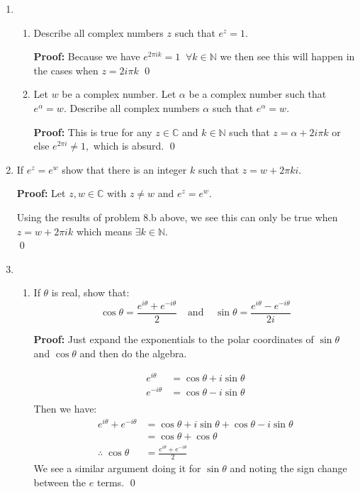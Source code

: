 \begin{enumerate}
	\item
	\begin{enumerate}
		\item Describe all complex numbers $z$ such that $e^z = 1.$
		
		\textbf{Proof:}
		Because we have $e^{2\pi i k} = 1 \;\; \forall k \in \mathbb{N}$ we then see this will happen in the cases when $ z = 2 i \pi k$
		\qed


		\item Let $w$ be a complex number. Let $\alpha$ be a complex number such that $e^{\alpha} = w.$ Describe all complex numbers $\alpha$ such that $e^\alpha = w.$
		
		\textbf{Proof:}
		This is true for any $z \in \mathbb{C}$ and $k \in \mathbb{N}$ such that $z = \alpha + 2i \pi k$ or else $e^{2\pi i} \neq 1,$ which is absurd.
		\qed
	\end{enumerate} 

	\item If $e^z = e^w$ show that there is an integer $k$ such that $z = w + 2\pi k i.$
	
	\textbf{Proof:}
	Let $z, w \in \mathbb{C}$ with $z \neq w$ and $e^z = e^w.$
	
	Using the results of problem 8.b above, we see this can only be true when $z = w + 2\pi i k$ which means $\exists k \in \mathbb{N}.$ \\
	\qed
	
	\item 
	\begin{enumerate}

		\item If $\theta$ is real, show that:
		\[\cos{\theta} = \frac{e^{i\theta} + e^{-i\theta}}{2} \;\;\;\ \text{and} \;\;\;\; \sin{\theta} = {\frac{e^{i\theta} - e^{-i\theta}}{2i}}\]
		
		\textbf{Proof:}
		Just expand the exponentials to the polar coordinates of $\sin\theta$ and $\cos\theta$ and then do the algebra.

		\begin{align*}
			e^{i\theta} &= \cos\theta + i\sin\theta \\
			e^{-i\theta} &= \cos\theta - i\sin\theta \\
		\end{align*}
		Then we have:
		\begin{align*}
			e^{i\theta} + e^{-i\theta} &= \cos\theta + i\sin\theta + \cos\theta - i\sin\theta \\
			&= \cos\theta + \cos\theta \\
			\therefore \; \cos\theta &=  \frac{e^{i\theta} + e^{-i\theta}}{2}
		\end{align*}
		We see a similar argument doing it for $\sin\theta$ and noting the sign change between the $e$ terms.
		\qed
	

\end{enumerate}
\end{enumerate}
